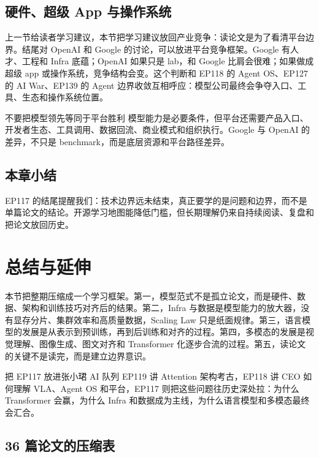 \documentclass[a4paper]{article}
\begin{document}
\subsection{硬件、超级 App 与操作系统}

上一节给读者学习建议，本节把学习建议放回产业竞争：读论文是为了看清平台边界。结尾对 OpenAI 和 Google 的讨论，可以放进平台竞争框架。Google 有人才、工程和 Infra 底蕴；OpenAI 如果只是 lab，和 Google 比肩会很难；如果做成超级 app 或操作系统，竞争结构会变。这个判断和 EP118 的 Agent OS、EP127 的 AI War、EP139 的 Agent 边界收敛互相呼应：模型公司最终会争夺入口、工具、生态和操作系统位置。

\begin{warningbox}{不要把模型领先等同于平台胜利}
模型能力是必要条件，但平台还需要产品入口、开发者生态、工具调用、数据回流、商业模式和组织执行。Google 与 OpenAI 的差异，不只是 benchmark，而是底层资源和平台路径差异。
\end{warningbox}

\subsection{本章小结}

EP117 的结尾提醒我们：技术边界远未结束，真正要学的是问题和边界，而不是单篇论文的结论。开源学习地图能降低门槛，但长期理解仍来自持续阅读、复盘和把论文放回历史。

\section{总结与延伸}

本节把整期压缩成一个学习框架。第一，模型范式不是孤立论文，而是硬件、数据、架构和训练技巧对齐后的结果。第二，Infra 与数据是模型能力的放大器，没有显存分片、集群效率和高质量数据，Scaling Law 只是纸面规律。第三，语言模型的发展是从表示到预训练，再到后训练和对齐的过程。第四，多模态的发展是视觉理解、图像生成、图文对齐和 Transformer 化逐步合流的过程。第五，读论文的关键不是读完，而是建立边界意识。

\begin{importantbox}{把 EP117 放进张小珺 AI 队列}
EP119 讲 Attention 架构考古，EP118 讲 CEO 如何理解 VLA、Agent OS 和平台，EP117 则把这些问题往历史深处拉：为什么 Transformer 会赢，为什么 Infra 和数据成为主线，为什么语言模型和多模态最终会汇合。
\end{importantbox}

\subsection{36 篇论文的压缩表}
\end{document}
